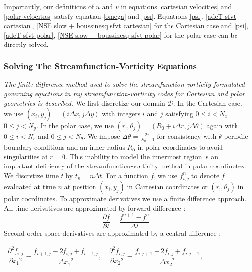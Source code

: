 \documentclass{article}
\begin{document}
\noindent Importantly, our definitions of $u$ and $v$ in equations \ref{cartesian velocities} and \ref{polar velocities} satisfy equation \ref{omega} and \ref{psi}. Equations \ref{psi}, \ref{adeT sfvt cartesian}, \ref{NSE slow + boussinesq sfvt cartesian} for the Cartesian case and \ref{psi}, \ref{adeT sfvt polar}, \ref{NSE slow + boussinesq sfvt polar} for the polar case can be directly solved.

\subsubsection*{Solving The Streamfunction-Vorticity Equations}
{\it{The finite difference method used to solve the streamfunction-vorticity-formulated governing equations in my streamfunction-vorticity codes for Cartesian and polar geometries is described. }}
\vspace{0.3cm}
\newline
\noindent We first discretize our domain $\mathcal{D}$. In the Cartesian case, we use $(x_i,y_j)=(i \Delta x, j \Delta y)
$ with integers $i$ and $j$ satisfying $0\leq i < N_x$ $0 \leq j < N_y$. In the polar case, we use $(r_i, \theta_j)= (R_0 
+ i \Delta r, j 
\Delta \theta)$ again with  $0 \leq i < N_r$ and $0 \leq j < N_{\theta}$. We impose $\Delta \theta = \frac{2 \pi}
{N_{\theta} - 1}$ for consistency with $\theta$-periodic boundary conditions and an inner radius $R_0$ in polar 
coordinates to avoid 
singularities at $r=0$. This inability to model the innermost region is an important deficiency of the streamfunction-vorticity method in polar coordinates. We discretize time $t$ by $t_n = n \Delta t$. For a function $f$, we use 
$f^n_{i,j}$ to denote $f$ evaluated at time $n$ at position $(x_i,y_j)$ in Cartesian coordinates or $(r_i, \theta_j)$ in 
polar coordinates. 
\newline
To approximate derivatives we use a finite difference approach. All time derivatives are approximated by forward difference \cite{press1986numerical}:
\begin{equation}
	\frac{\partial f}{\partial t} = \frac{f^{n+1} - f^{n}}{\Delta t}
	\label{forward time difference}
\end{equation}
Second order space derivatives are approximated by a central difference \cite{press1986numerical}:
\newline
\begin{tabularx}{\textwidth}{XX}
\begin{equation}
	\frac{\partial^2 f_{i,j}}{\partial {x_1}^2} = \frac{f_{i+1,j} - 2 f_{i,j} + f_{i-1,j}}{{\Delta x_1}^2},
\end{equation}
    &
\begin{equation}
	\frac{\partial^2 f_{i,j}}{\partial {x_2}^2} = \frac{f_{i,j+1} - 2 f_{i,j} + f_{i,j-1}}{{\Delta x_2}^2},
\end{equation}
\end{tabularx}
\end{document}
